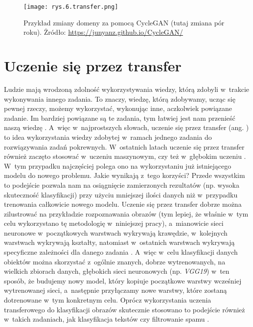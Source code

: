 \begin{figure}[h]
    \centering
    \texttt{[image: rys.6.transfer.png]}
    \caption{Przykład zmiany domeny za pomocą CycleGAN (tutaj zmiana pór roku). \protect\linebreak Żródło: \protect\url{https://junyanz.github.io/CycleGAN/}}
    \label{fig:mesh6}
\end{figure}

\section{Uczenie się przez transfer}
\label{cha:cha3.5}

Ludzie mają wrodzoną zdolność wykorzystywania wiedzy, którą zdobyli w~trakcie wykonywania innego zadania. To znaczy, wiedzę, którą zdobywamy, ucząc się pewnej rzeczy, możemy wykorzystać, wykonując inne, aczkolwiek powiązane zadanie. Im bardziej powiązane są te zadania, tym łatwiej jest nam przenieść naszą wiedzę \cite{Sarkar18}. A~więc w~najprostszych słowach, uczenie się przez transfer (ang. ) to idea wykorzystania wiedzy zdobytej w~ramach jednego zadania do rozwiązywania zadań pokrewnych. W~ostatnich latach uczenie się przez transfer również zaczęto stosować w~uczeniu maszynowym, czy też w~głębokim uczeniu \cite{Chmiel20}. W~tym przypadku najczęściej polega ono na wykorzystaniu już istniejącego modelu do nowego problemu. Jakie wynikają z~tego korzyści? Przede wszystkim to podejście pozwala nam na osiągnięcie zamierzonych rezultatów (np. wysoka skuteczność klasyfikacji) przy użyciu mniejszej ilości danych niż w~przypadku trenowania całkowicie nowego modelu. 
Uczenie się przez transfer dobrze można zilustrować na przykładzie rozpoznawania obrazów (tym lepiej, że właśnie w~tym celu wykorzystano tę metodologię w~niniejszej pracy), a~mianowicie sieci neuronowe w~początkowych warstwach wykrywają krawędzie, w~kolejnych warstwach wykrywają kształty, natomiast w~ostatnich warstwach wykrywają specyficzne zależności dla danego zadania \cite{Chmiel20}. A~więc w~celu klasyfikacji danych obiektów można skorzystać z~ogólnie znanych, dobrze wytrenowanych, na wielkich zbiorach danych, głębokich sieci neuronowych (np. \textit{VGG19}) w~ten sposób, że budujemy nowy model, który kopiuje początkowe warstwy wcześniej wytrenowanej sieci, a~następnie przyłączamy nowe warstwy, które zostaną dotrenowane w~tym konkretnym celu. Oprócz wykorzystania uczenia transferowego do klasyfikacji obrazów skutecznie stosowano to podejście również w~takich zadaniach, jak klasyfikacja tekstów czy filtrowanie spamu \cite{Bickel06}. 

